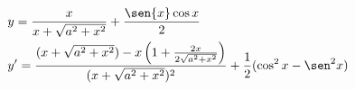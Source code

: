 \begin{ex}
\begin{align}
&y=\frac{x}{x+\sqrt{a^2+x^2}}+\frac{\sen{x}\cos{x}}{2}\nonumber\\
&y'=\frac{(x+\sqrt{a^2+x^2})-x\left(1+\frac{2x}{2\sqrt{a^2+x^2}}\right)}{(x+\sqrt{a^2+x^2})^2}+\frac{1}{2}(\cos^2{x}-\sen^2{x})\nonumber
\end{align}
\end{ex}